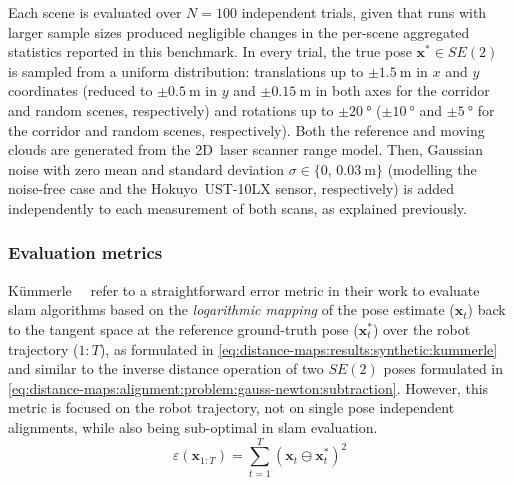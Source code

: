 Each scene is evaluated over $N=100$ independent trials, given that runs with
larger sample sizes produced negligible changes in the per-scene aggregated
statistics reported in this benchmark.
In every trial, the true pose $\mathbf{x}^{*}\in SE(2)$ is
sampled from a uniform distribution:
translations up to $\pm\SI{1.5}{\metre}$ in $x$ and $y$ coordinates
(reduced to $\pm\SI{0.5}{\metre}$ in $y$ and $\pm\SI{0.15}{\metre}$ in both
axes for the corridor and random scenes, respectively) and rotations up to
$\pm\SI{20}{\degree}$ ($\pm\SI{10}{\degree}$ and $\pm\SI{5}{\degree}$ for the
corridor and random scenes, respectively).
Both the reference and moving clouds
are generated from the 2D~laser scanner range model. Then, Gaussian noise with
zero mean and standard deviation $\sigma\in\{0,\,\SI{0.03}{\metre}\}$
(modelling the noise-free case and the Hokuyo~UST-10LX sensor, respectively) is
added independently to each measurement of both scans, as explained previously.

\subsubsection{Evaluation metrics}
\label{sec:distance-maps:results:synthetic:metrics}

Kümmerle~\etal~\cite{kummerle:ar:2009} refer to a straightforward error metric
in their work to evaluate \gls{slam} algorithms based on the \emph{logarithmic
mapping} of the pose estimate ($\mathbf{x}_t$) back to the tangent space at the
reference ground-truth pose ($\mathbf{x}_t^*$) over the robot trajectory ($1:T$),
as formulated in \eqref{eq:distance-maps:results:synthetic:kummerle} and similar
to the inverse distance operation of two $SE(2)$ poses formulated in
\eqref{eq:distance-maps:alignment:problem:gauss-newton:subtraction}.
However, this metric is focused on the robot trajectory, not on single pose
independent alignments, while also being sub-optimal in \gls{slam} evaluation.
\begin{equation}
\label{eq:distance-maps:results:synthetic:kummerle}
\varepsilon\!\left(\mathbf{x}_{1:T}\right) =
\sum_{t=1}^{T}\left(\mathbf{x}_t\ominus\mathbf{x}_t^*\right)^2
\end{equation}

